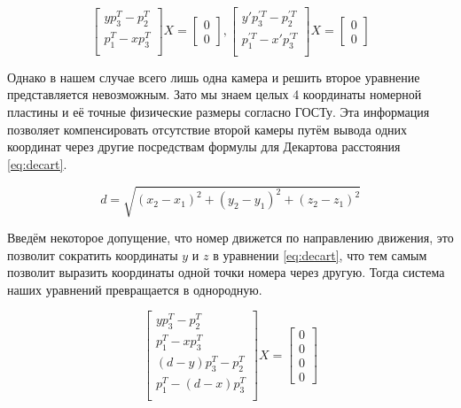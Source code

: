 \documentclass[specification,annotation,times]{itmo-student-thesis}
\begin{document}
\begin{equation}
\mathit{
    \begin{bmatrix}
       y p_3^T - p_2^T \\
       p_1^T - x p_3^T \\
     \end{bmatrix} X =
     \begin{bmatrix}
         0 \\
         0
     \end{bmatrix} ,
     \begin{bmatrix}
       y' p_3^{'T} - p_2^{'T} \\
       p_1^{'T} - x' p_3^{'T} \\
     \end{bmatrix} X =
     \begin{bmatrix}
         0 \\
         0
     \end{bmatrix}
}
\label{eq:final2}
\end{equation}


Однако в нашем случае всего лишь одна камера и решить второе уравнение представляется невозможным. Зато мы знаем целых 4 координаты номерной пластины и её точные физические размеры согласно ГОСТу. Эта информация позволяет компенсировать отсутствие второй камеры путём вывода одних координат через другие посредствам формулы для Декартова расстояния \ref{eq:decart}.

\begin{equation}
\mathit{ d=\sqrt{ 	(x_{2}-x_{1})^{2}   +   (y_{2}-y_{1})^{2}   +   (z_{2}-z_{1})^{2} }  }
\label{eq:decart}
\end{equation}

Введём некоторое допущение, что номер движется по направлению движения, это позволит сократить координаты $ y $ и $ z $ в уравнении \ref{eq:decart}, что тем самым позволит выразить координаты одной точки номера через другую. Тогда система наших уравнений превращается в однородную.

\begin{equation}
\mathit{
    \begin{bmatrix}
       y p_3^T - p_2^T \\
       p_1^T - x p_3^T \\
       (d - y) p_3^T - p_2^T \\
       p_1^T - (d - x) p_3^T \\
     \end{bmatrix} X =
     \begin{bmatrix}
         0 \\
         0 \\
         0 \\
         0
     \end{bmatrix}
}
\label{eq:system}
\end{equation}
\end{document}
